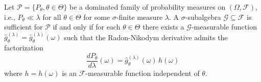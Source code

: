 Let $\mathcal{P} = \{P_{\theta}, \theta \in \Theta\}$ be a dominated family of probability measures on $(\Omega, \mathcal{F})$, i.e., $P_{\theta} \ll \lambda$ for all $\theta \in \Theta$ for some $\sigma$-finite measure $\lambda$. A $\sigma$-subalgebra $\mathcal{G} \subseteq \mathcal{F}$ is sufficient for $\mathcal{P}$ if and only if for each $\theta \in \Theta$ there exists a $\mathcal{G}$-measurable function $\hat{g}_{\theta}^{(\lambda)} = \hat{g}_{\theta}^{(\lambda)}(\omega)$ such that the Radon-Nikodym derivative admits the factorization
$$\frac{dP_{\theta}}{d\lambda}(\omega) = \hat{g}_{\theta}^{(\lambda)}(\omega)\, h(\omega)$$
where $h = h(\omega)$ is an $\mathcal{F}$-measurable function independent of $\theta$.
